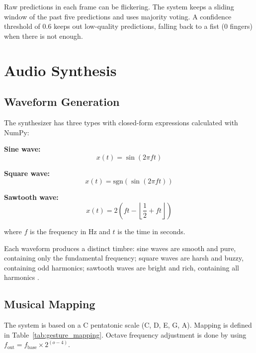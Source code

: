 \documentclass[conference]{IEEEtran}
\begin{document}
Raw predictions in each frame can be flickering. The system keeps a sliding window of the past five predictions and uses majority voting. A confidence threshold of 0.6 keeps out low-quality predictions, falling back to a fist (0 fingers) when there is not enough.

\section{Audio Synthesis}

\subsection{Waveform Generation}

The synthesizer has three types with closed-form expressions calculated with NumPy:

\textbf{Sine wave:}
\begin{equation}
x(t) = \sin(2\pi f t)
\label{eq:sine}
\end{equation}

\textbf{Square wave:}
\begin{equation}
x(t) = \text{sgn}(\sin(2\pi f t))
\label{eq:square}
\end{equation}

\textbf{Sawtooth wave:}
\begin{equation}
x(t) = 2\left(ft - \left\lfloor \frac{1}{2} + ft \right\rfloor\right)
\label{eq:sawtooth}
\end{equation}

where $f$ is the frequency in Hz and $t$ is the time in seconds.

Each waveform produces a distinct timbre: sine waves are smooth and pure, containing only the fundamental frequency; square waves are harsh and buzzy, containing odd harmonics; sawtooth waves are bright and rich, containing all harmonics \cite{smith2007mathematics}.

\subsection{Musical Mapping}

The system is based on a C pentatonic scale (C, D, E, G, A). Mapping is defined in Table~\ref{tab:gesture_mapping}. Octave frequency adjustment is done by using $f_{\text{out}} = f_{\text{base}} \times 2^{(o-4)}$.
\end{document}

